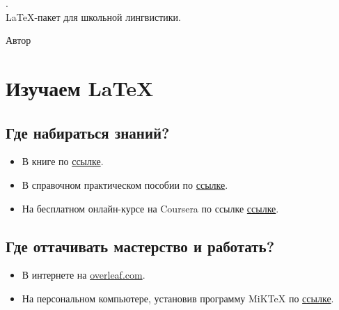 \newpage 

\thispagestyle{empty}

\vspace*{7cm}
\begin{center}
    { \huge {}. } \\
    { \Large \LaTeX-пакет для школьной лингвистики. }\\
\end{center}


\vspace*{7cm}
\begin{flushright}
    Автор
\end{flushright}


\newpage

\tableofcontents

\newpage


\chapter[Изучаем \LaTeX]{Изучаем \LaTeX}


\section{Где набираться знаний?}

\begin{itemize}
    \setlength{\itemsep}{0pt}
    \item В книге по \href{https://www.mccme.ru/free-books/llang/newllang.pdf}{ссылке}.
    \item В справочном практическом пособии по \href{http://www.ccas.ru/voron/download/voron05latex.pdf}{ссылке}.
    \item На бесплатном онлайн-курсе на Coursera по ссылке \href{https://ru.coursera.org/learn/latex}{ссылке}.
\end{itemize}


\section{Где оттачивать мастерство и работать?}

\begin{itemize}
    \setlength{\itemsep}{0pt}
    \item В интернете на \href{overleaf.com}{overleaf.com}.
    \item На персональном компьютере, установив программу MiKTeX по \href{https://miktex.org/download}{ссылке}.
\end{itemize}


